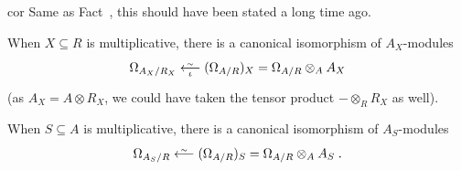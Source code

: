 \documentclass[a4paper,parskip=half,numbers=enddot, DIV=12]{scrreprt}
\begin{document}
\begin{varthm}{cor}
	Same as Fact~, this should have been stated a long time ago.
    \begin{alphanumerate}
        \item[\itememph{c}]
	        When $X\subseteq R$ is multiplicative, there is a canonical isomorphism of $A_X$-modules
	        \begin{align}\lbl{eq:KahlerLocalizationIso1}
		        \Omega_{A_X/R_X} \lisomorphism[\iota] (\Omega_{A/R})_X=\Omega_{A/R}\otimes _AA_X
	        \end{align}
	        (as $A_X=A\otimes R_X$, we could have taken the tensor product $-\otimes_RR_X$ as well).           
        \item[\itememph{d}]
	        When $S\subseteq A$ is multiplicative, there is a canonical isomorphism of $A_S$-modules
	        \begin{align}\lbl{eq:KahlerLocalizationIso2}
		        \Omega_{A_S/R} \lisomorphism(\Omega_{A/R})_S=\Omega_{A/R}\otimes_A A_S\;.
	        \end{align}
    \end{alphanumerate}
\end{varthm}
\end{document}
